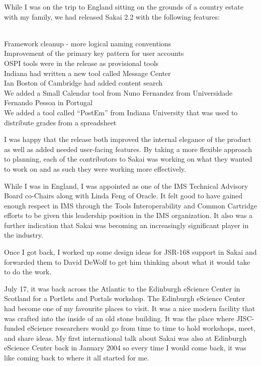 \documentclass[12pt]{book}
\begin{document}
While I was on the trip to England sitting on the grounds of a country
estate with my family, we had released Sakai 2.2 with the following
features:\\
\\
\begin{sf}
Framework cleanup - more logical naming conventions\\
Improvement of the primary key pattern for user accounts\\
OSPI tools were in the release as provisional tools\\
Indiana had written a new tool called Message Center\\
Ian Boston of Cambridge had added content search\\
We added a Small Calendar tool from Nuno Fernandez from
  Universidade Fernando Pessoa in Portugal\\
We added a tool called ``PostEm'' from Indiana University
  that was used to distribute grades from a spreadsheet\\
\end{sf}

I was happy that the release both improved the internal elegance of the
product as well as added needed user-facing features.  By taking a more
flexible approach to planning, each of the contributors to Sakai was
working on what they wanted to work on and as such they were
working more effectively.

While I was in England, I was appointed as one of the IMS Technical
Advisory Board co-Chairs along with Linda Feng of Oracle.  It felt good
to have gained enough respect in IMS through the Tools Interoperability
and Common Cartridge efforts to be given this leadership position
in the IMS organization.  It also was a further indication that Sakai
was becoming an increasingly significant player in the industry.

Once I got back, I worked up some design ideas for JSR-168 support
in Sakai and forwarded them to David DeWolf to get him thinking about
what it would take to do the work.

July 17, it was back across the Atlantic to the Edinburgh eScience
Center in Scotland for a Portlets and Portals workshop.  The Edinburgh eScience
Center had become one of my favourite places to visit.  It was a nice modern
facility that was crafted into the inside of an old stone building.
It was the place where JISC-funded eScience researchers would
go from time to time to hold workshops, meet, and share ideas.
My first international talk about Sakai was also at Edinburgh eScience
Center back in January 2004 so every time I would come back, it was
like coming back to where it all started for me.
\end{document}
